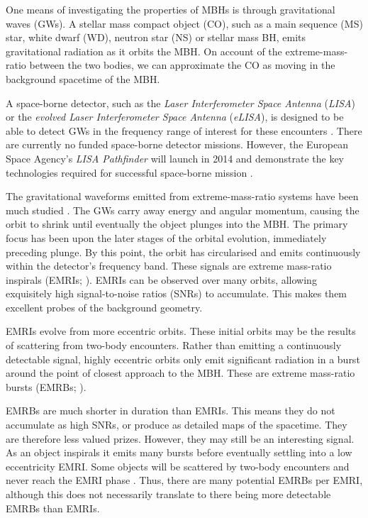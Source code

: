 \documentclass[useAMS,usedcolumn,usegraphicx,usenatbib]{mn2e}
\begin{document}
One means of investigating the properties of MBHs is through gravitational waves (GWs). A stellar mass compact object (CO), such as a main sequence (MS) star, white dwarf (WD), neutron star (NS) or stellar mass BH, emits gravitational radiation as it orbits the MBH. On account of the extreme-mass-ratio between the two bodies, we can approximate the CO as moving in the background spacetime of the MBH.

A space-borne detector, such as the \textit{Laser Interferometer Space Antenna} (\textit{LISA}) or the \textit{evolved Laser Interferometer Space Antenna} (\textit{eLISA}), is designed to be able to detect GWs in the frequency range of interest for these encounters \citep{Bender1998, Danzmann2003, Jennrich2011, Amaro-Seoane2012a}. There are currently no funded space-borne detector missions. However, the European Space Agency's \textit{LISA Pathfinder} will launch in 2014 and demonstrate the key technologies required for successful space-borne mission \citep{Anza2005, Antonucci2012}.

The gravitational waveforms emitted from extreme-mass-ratio systems have been much studied \citep{Glampedakis2005, Barack2009}. The GWs carry away energy and angular momentum, causing the orbit to shrink until eventually the object plunges into the MBH. The primary focus has been upon the later stages of the orbital evolution, immediately preceding plunge. By this point, the orbit has circularised and emits continuously within the detector's frequency band. These signals are extreme mass-ratio inspirals (EMRIs; \citealt{Amaro-Seoane2007}). EMRIs can be observed over many orbits, allowing exquisitely high signal-to-noise ratios (SNRs) to accumulate. This makes them excellent probes of the background geometry.

EMRIs evolve from more eccentric orbits. These initial orbits may be the results of scattering from two-body encounters. Rather than emitting a continuously detectable signal, highly eccentric orbits only emit significant radiation in a burst around the point of closest approach to the MBH. These are extreme mass-ratio bursts (EMRBs; \citealt*{Rubbo2006}).

EMRBs are much shorter in duration than EMRIs. This means they do not accumulate as high SNRs, or produce as detailed maps of the spacetime. They are therefore less valued prizes. However, they may still be an interesting signal. As an object inspirals it emits many bursts before eventually settling into a low eccentricity EMRI. Some objects will be scattered by two-body encounters and never reach the EMRI phase \citep{Alexander2003}. Thus, there are many potential EMRBs per EMRI, although this does not necessarily translate to there being more detectable EMRBs than EMRIs.
\end{document}

